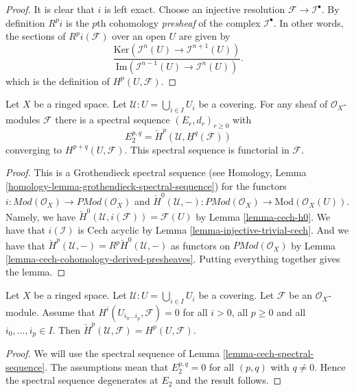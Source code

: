 \begin{proof}
It is clear that $i$ is left exact.
Choose an injective resolution $\mathcal{F} \to \mathcal{I}^\bullet$.
By definition $R^pi$ is the $p$th cohomology {\it presheaf}
of the complex $\mathcal{I}^\bullet$. In other words, the
sections of $R^pi(\mathcal{F})$ over an open $U$ are given by
$$
\frac{\text{Ker}(\mathcal{I}^n(U) \to \mathcal{I}^{n + 1}(U))}
{\text{Im}(\mathcal{I}^{n - 1}(U) \to \mathcal{I}^n(U))}.
$$
which is the definition of $H^p(U, \mathcal{F})$.
\end{proof}

\begin{lemma}
\label{lemma-cech-spectral-sequence}
Let $X$ be a ringed space.
Let $\mathcal{U} : U = \bigcup_{i \in I} U_i$ be a covering.
For any sheaf of $\mathcal{O}_X$-modules $\mathcal{F}$ there
is a spectral sequence $(E_r, d_r)_{r \geq 0}$ with
$$
E_2^{p, q} = \check{H}^p(\mathcal{U}, \underline{H}^q(\mathcal{F}))
$$
converging to $H^{p + q}(U, \mathcal{F})$.
This spectral sequence is functorial in $\mathcal{F}$.
\end{lemma}

\begin{proof}
This is a Grothendieck spectral sequence
(see Homology, Lemma \ref{homology-lemma-grothendieck-spectral-sequence})
for the functors
$i :  \textit{Mod}(\mathcal{O}_X) \to \textit{PMod}(\mathcal{O}_X)$
and
$\check{H}^0(\mathcal{U}, - ) : \textit{PMod}(\mathcal{O}_X)
\to \text{Mod}(\mathcal{O}_X(U))$.
Namely, we have $\check{H}^0(\mathcal{U}, i(\mathcal{F})) = \mathcal{F}(U)$
by Lemma \ref{lemma-cech-h0}. We have that $i(\mathcal{I})$ is 
Cech acyclic by Lemma \ref{lemma-injective-trivial-cech}. And we
have that $\check{H}^p(\mathcal{U}, -) = R^p\check{H}^0(\mathcal{U}, -)$
as functors on $\textit{PMod}(\mathcal{O}_X)$
by Lemma \ref{lemma-cech-cohomology-derived-presheaves}.
Putting everything together gives the lemma.
\end{proof}

\begin{lemma}
\label{lemma-cech-spectral-sequence-application}
Let $X$ be a ringed space.
Let $\mathcal{U} : U = \bigcup_{i \in I} U_i$ be a covering.
Let $\mathcal{F}$ be an $\mathcal{O}_X$-module.
Assume that $H^i(U_{i_0 \ldots i_p}, \mathcal{F}) = 0$
for all $i > 0$, all $p \geq 0$ and all $i_0, \ldots, i_p \in I$.
Then $\check{H}^p(\mathcal{U}, \mathcal{F}) = H^p(U, \mathcal{F})$.
\end{lemma}

\begin{proof}
We will use the spectral sequence of
Lemma \ref{lemma-cech-spectral-sequence}.
The assumptions mean that $E_2^{p, q} = 0$ for all $(p, q)$ with
$q \not = 0$. Hence the spectral sequence degenerates at $E_2$
and the result follows.
\end{proof}



